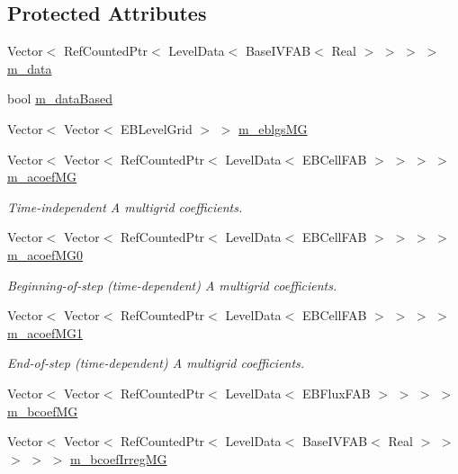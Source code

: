 \subsection*{Protected Attributes}
\begin{DoxyCompactItemize}
\item 
Vector$<$ Ref\+Counted\+Ptr$<$ Level\+Data$<$ Base\+I\+V\+F\+AB$<$ Real $>$ $>$ $>$ $>$ \hyperlink{classnwoebconductivityopfactory_af62c936e4d221df5407324c8a88b3941}{m\+\_\+data}
\item 
bool \hyperlink{classnwoebconductivityopfactory_af795e17ac2401a1ac6faf3067b21166e}{m\+\_\+data\+Based}
\item 
Vector$<$ Vector$<$ E\+B\+Level\+Grid $>$ $>$ \hyperlink{classnwoebconductivityopfactory_a3bf612961cbcfb5463794f3d30012be6}{m\+\_\+eblgs\+MG}
\item 
Vector$<$ Vector$<$ Ref\+Counted\+Ptr$<$ Level\+Data$<$ E\+B\+Cell\+F\+AB $>$ $>$ $>$ $>$ \hyperlink{classnwoebconductivityopfactory_ad336a5da2bf9ebfc1470688e5e0c90ce}{m\+\_\+acoef\+MG}
\begin{DoxyCompactList}\small\item\em Time-\/independent A multigrid coefficients. \end{DoxyCompactList}\item 
Vector$<$ Vector$<$ Ref\+Counted\+Ptr$<$ Level\+Data$<$ E\+B\+Cell\+F\+AB $>$ $>$ $>$ $>$ \hyperlink{classnwoebconductivityopfactory_a9c9140eb99f9ffc5c7ea8fc6e009fafe}{m\+\_\+acoef\+M\+G0}
\begin{DoxyCompactList}\small\item\em Beginning-\/of-\/step (time-\/dependent) A multigrid coefficients. \end{DoxyCompactList}\item 
Vector$<$ Vector$<$ Ref\+Counted\+Ptr$<$ Level\+Data$<$ E\+B\+Cell\+F\+AB $>$ $>$ $>$ $>$ \hyperlink{classnwoebconductivityopfactory_a0f501febd3597e21edc61fad53ddaccd}{m\+\_\+acoef\+M\+G1}
\begin{DoxyCompactList}\small\item\em End-\/of-\/step (time-\/dependent) A multigrid coefficients. \end{DoxyCompactList}\item 
Vector$<$ Vector$<$ Ref\+Counted\+Ptr$<$ Level\+Data$<$ E\+B\+Flux\+F\+AB $>$ $>$ $>$ $>$ \hyperlink{classnwoebconductivityopfactory_a17629dd7d8510eb48dd9f4f23d1f8a2e}{m\+\_\+bcoef\+MG}
\item 
Vector$<$ Vector$<$ Ref\+Counted\+Ptr$<$ Level\+Data$<$ Base\+I\+V\+F\+AB$<$ Real $>$ $>$ $>$ $>$ $>$ \hyperlink{classnwoebconductivityopfactory_a833457bad5411bfb49a3623aad19fd05}{m\+\_\+bcoef\+Irreg\+MG}

\end{DoxyCompactItemize}
